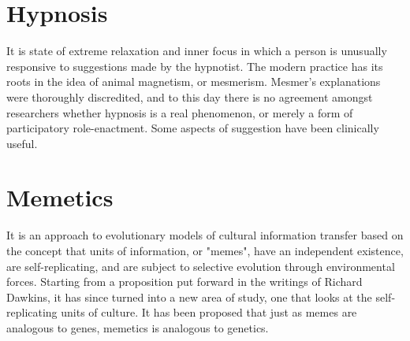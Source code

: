 \documentclass[a4paper]{article}
\begin{document}
\section{Hypnosis}
It is state of extreme relaxation and inner focus in which a person is unusually responsive to suggestions made by the hypnotist. The modern practice has its roots in the idea of animal magnetism, or mesmerism.
Mesmer's explanations were thoroughly discredited, and to this day there is no agreement amongst researchers whether hypnosis is a real phenomenon, or merely a form of participatory role-enactment.
Some aspects of suggestion have been clinically useful.


\section{Memetics}

  It is an approach to evolutionary models of cultural information transfer based on the concept that units of information, or "memes", have an independent existence, are self-replicating, and are subject to selective evolution through environmental forces. Starting from a proposition put forward in the writings of Richard Dawkins, it has since turned into a new area of study, one that looks at the self-replicating units of culture. It has been proposed that just as memes are analogous to genes, memetics is analogous to genetics.
\end{document}
